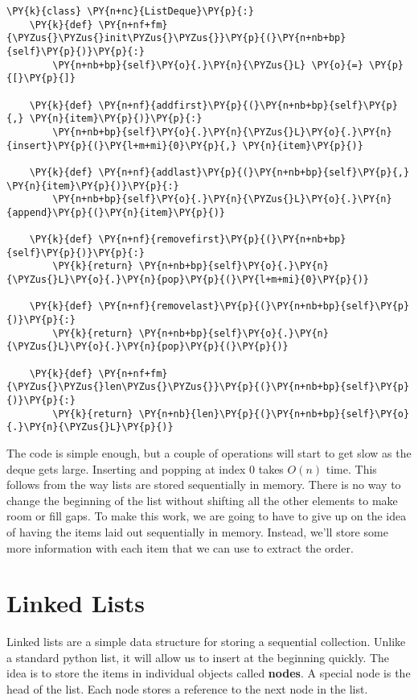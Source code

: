 \begin{Verbatim}[commandchars=\\\{\}]
\PY{k}{class} \PY{n+nc}{ListDeque}\PY{p}{:}
    \PY{k}{def} \PY{n+nf+fm}{\PYZus{}\PYZus{}init\PYZus{}\PYZus{}}\PY{p}{(}\PY{n+nb+bp}{self}\PY{p}{)}\PY{p}{:}
        \PY{n+nb+bp}{self}\PY{o}{.}\PY{n}{\PYZus{}L} \PY{o}{=} \PY{p}{[}\PY{p}{]}

    \PY{k}{def} \PY{n+nf}{addfirst}\PY{p}{(}\PY{n+nb+bp}{self}\PY{p}{,} \PY{n}{item}\PY{p}{)}\PY{p}{:}
        \PY{n+nb+bp}{self}\PY{o}{.}\PY{n}{\PYZus{}L}\PY{o}{.}\PY{n}{insert}\PY{p}{(}\PY{l+m+mi}{0}\PY{p}{,} \PY{n}{item}\PY{p}{)}

    \PY{k}{def} \PY{n+nf}{addlast}\PY{p}{(}\PY{n+nb+bp}{self}\PY{p}{,} \PY{n}{item}\PY{p}{)}\PY{p}{:}
        \PY{n+nb+bp}{self}\PY{o}{.}\PY{n}{\PYZus{}L}\PY{o}{.}\PY{n}{append}\PY{p}{(}\PY{n}{item}\PY{p}{)}

    \PY{k}{def} \PY{n+nf}{removefirst}\PY{p}{(}\PY{n+nb+bp}{self}\PY{p}{)}\PY{p}{:}
        \PY{k}{return} \PY{n+nb+bp}{self}\PY{o}{.}\PY{n}{\PYZus{}L}\PY{o}{.}\PY{n}{pop}\PY{p}{(}\PY{l+m+mi}{0}\PY{p}{)}

    \PY{k}{def} \PY{n+nf}{removelast}\PY{p}{(}\PY{n+nb+bp}{self}\PY{p}{)}\PY{p}{:}
        \PY{k}{return} \PY{n+nb+bp}{self}\PY{o}{.}\PY{n}{\PYZus{}L}\PY{o}{.}\PY{n}{pop}\PY{p}{(}\PY{p}{)}

    \PY{k}{def} \PY{n+nf+fm}{\PYZus{}\PYZus{}len\PYZus{}\PYZus{}}\PY{p}{(}\PY{n+nb+bp}{self}\PY{p}{)}\PY{p}{:}
        \PY{k}{return} \PY{n+nb}{len}\PY{p}{(}\PY{n+nb+bp}{self}\PY{o}{.}\PY{n}{\PYZus{}L}\PY{p}{)}
\end{Verbatim}



The code is simple enough, but a couple of operations will start to get slow as the deque gets large.
Inserting and popping at index $0$ takes $O(n)$ time.
This follows from the way lists are stored sequentially in memory.
There is no way to change the beginning of the list without shifting all the other elements to make room or fill gaps.
To make this work, we are going to have to give up on the idea of having the items laid out sequentially in memory.
Instead, we'll store some more information with each item that we can use to extract the order.

\section{Linked Lists}


Linked lists are a simple data structure for storing a sequential collection.
Unlike a standard python list, it will allow us to insert at the beginning quickly.
The idea is to store the items in individual objects called \textbf{nodes}.
A special node is the head of the list.
Each node stores a reference to the next node in the list.


